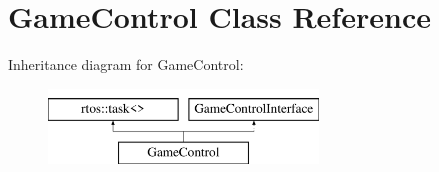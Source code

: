 \hypertarget{class_game_control}{}\section{Game\+Control Class Reference}
\label{class_game_control}
Inheritance diagram for Game\+Control\+:\begin{figure}[H]
\begin{center}
\leavevmode
\includegraphics[height=2.000000cm]{class_game_control}
\end{center}
\end{figure}
